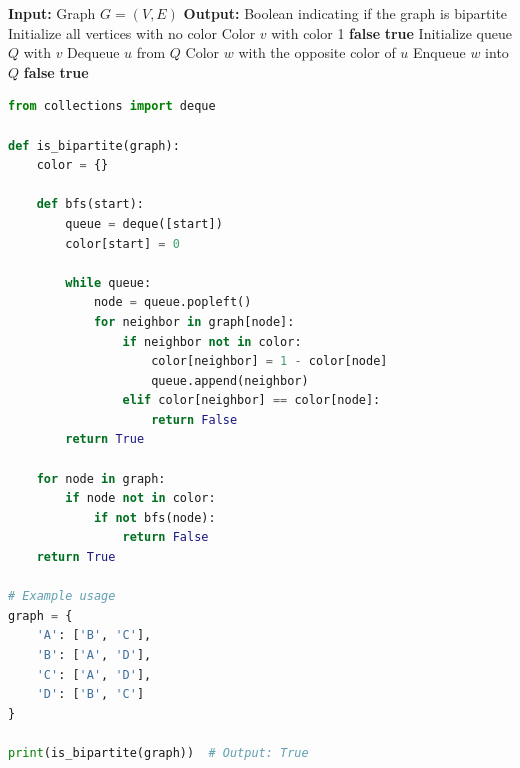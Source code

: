 \documentclass[12pt]{book} %
\begin{document}
\begin{algorithm}
\caption{Bipartite Graph Check using BFS}
\begin{algorithmic}[1]
\State \textbf{Input:} Graph $G=(V, E)$
\State \textbf{Output:} Boolean indicating if the graph is bipartite
\State Initialize all vertices with no color
        \State Color $v$ with color 1
            \State \Return \textbf{false}
        \EndIf
    \EndIf
\EndFor
\State \Return \textbf{true}
    \State Initialize queue $Q$ with $v$
        \State Dequeue $u$ from $Q$
                \State Color $w$ with the opposite color of $u$
                \State Enqueue $w$ into $Q$
                \State \Return \textbf{false}
            \EndIf
        \EndFor
    \EndWhile
    \State \Return \textbf{true}
\EndFunction
\end{algorithmic}
\end{algorithm}

\FloatBarrier
\begin{lstlisting}[language=Python, caption=Python implementation of Bipartite Check using BFS]
from collections import deque

def is_bipartite(graph):
    color = {}
    
    def bfs(start):
        queue = deque([start])
        color[start] = 0
        
        while queue:
            node = queue.popleft()
            for neighbor in graph[node]:
                if neighbor not in color:
                    color[neighbor] = 1 - color[node]
                    queue.append(neighbor)
                elif color[neighbor] == color[node]:
                    return False
        return True
    
    for node in graph:
        if node not in color:
            if not bfs(node):
                return False
    return True

# Example usage
graph = {
    'A': ['B', 'C'],
    'B': ['A', 'D'],
    'C': ['A', 'D'],
    'D': ['B', 'C']
}

print(is_bipartite(graph))  # Output: True
\end{lstlisting}
\FloatBarrier
\end{document}
